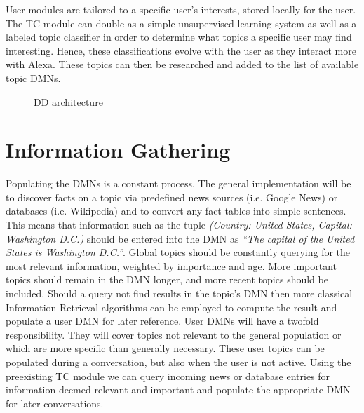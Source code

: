 \documentclass[10pt,twoside,twocolumn]{article}
\begin{document}
\noindent
User modules are tailored to a specific user's interests, stored locally for the user. The TC module can double as a simple unsupervised learning system as well as a labeled topic classifier in order to determine what topics a specific user may find interesting. Hence, these classifications evolve with the user as they interact more with Alexa. These topics can then be researched and added to the list of available topic DMNs.

\begin{figure}
    \centering
    
    \label{DD_design}
    \caption{DD architecture}
\end{figure}

\section{Information Gathering \label{section_info}}
Populating the DMNs is a constant process. The general implementation will be to discover facts on a topic via predefined news sources (i.e. Google News) or databases (i.e. Wikipedia) and to convert any fact tables into simple sentences. This means that information such as the tuple \emph{(Country: United States, Capital: Washington D.C.)} should be entered into the DMN as \emph{``The capital of the United States is Washington D.C.''}. Global topics should be constantly querying for the most relevant information, weighted by importance and age. More important topics should remain in the DMN longer, and more recent topics should be included. Should a query not find results in the topic's DMN then more classical Information Retrieval algorithms can be employed to compute the result and populate a user DMN for later reference. User DMNs will have a twofold responsibility. They will cover topics not relevant to the general population or which are more specific than generally necessary.
These user topics can be populated during a conversation, but also when the user is not active. Using the preexisting TC module we can query incoming news or database entries for information deemed relevant and important and populate the appropriate DMN for later conversations. 


 
\end{document}
